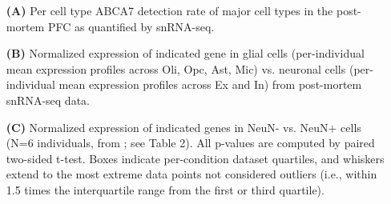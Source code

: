 \begin{itemize}
    \item[\textbf{(A)}] Per cell type ABCA7 detection rate of major cell types in the post-mortem PFC as quantified by snRNA-seq. 
    \item[\textbf{(B)}] Normalized expression of indicated gene in glial cells (per-individual mean expression profiles across Oli, Opc, Ast, Mic) vs. neuronal cells (per-individual mean expression profiles across Ex and In) from post-mortem snRNA-seq data. 
    \item[\textbf{(C)}] Normalized expression of indicated genes in NeuN- vs. NeuN+ cells (N=6 individuals, from \cite{Welch2022-aa}; see Table 2). All p-values are computed by paired two-sided t-test. Boxes indicate per-condition dataset quartiles, and whiskers extend to the most extreme data points not considered outliers (i.e., within 1.5 times the interquartile range from the first or third quartile).
\end{itemize}